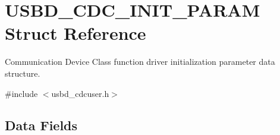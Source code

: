 \hypertarget{structUSBD__CDC__INIT__PARAM}{\section{U\-S\-B\-D\-\_\-\-C\-D\-C\-\_\-\-I\-N\-I\-T\-\_\-\-P\-A\-R\-A\-M Struct Reference}
\label{structUSBD__CDC__INIT__PARAM}
}


Communication Device Class function driver initialization parameter data structure.  




{\ttfamily \#include $<$usbd\-\_\-cdcuser.\-h$>$}

\subsection*{Data Fields}
